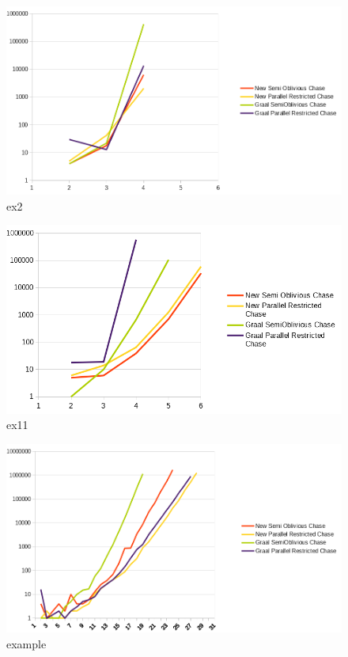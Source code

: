 \begin{figure}
\centering
\includegraphics[width=\textwidth]{pictures/benchmark old-new/ex2oldnew.png}
\caption{ex2}
\label{fig:ex2oldnew}
\end{figure}

\begin{figure}
\centering
\includegraphics[width=\textwidth]{pictures/benchmark old-new/ex11oldnew.png}
\caption{ex11}
\label{fig:ex11oldnew}
\end{figure}

\begin{figure}
\centering
\includegraphics[width=\textwidth]{pictures/benchmark old-new/exampleoldnew.png}
\caption{example}
\label{fig:exampleoldnew}
\end{figure}

